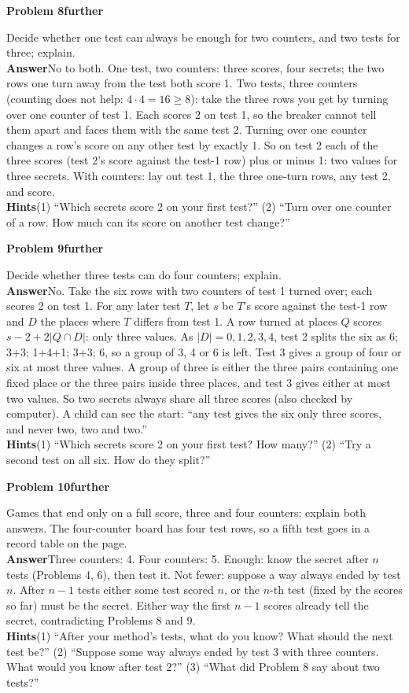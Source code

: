 \documentclass[11pt]{article}
\newcommand{\further}{\textcolor{tagmore}{\textbf{further}}}
\newcommand{\pb}[3]{\par\needspace{5\baselineskip}\medskip\textbf{Problem #1}\enspace{\small page #2}\enspace\textperiodcentered\enspace #3\par\nopagebreak}
\newcommand{\lab}[1]{\textbf{#1}\enspace}
\newcommand{\hints}[1]{\lab{Hints}#1}
\begin{document}
\pb{8}{7}{\further}
Decide whether one test can always be enough for two counters, and two tests for three; explain.\\
\lab{Answer}No to both. One test, two counters: three scores, four secrets; the two rows one turn away from the test both score 1.
Two tests, three counters (counting does not help: $4\cdot4=16\ge 8$): take the three rows you get by turning over one counter of test 1. Each scores 2 on test 1, so the breaker cannot tell them apart and faces them with the same test 2. Turning over one counter changes a row's score on any other test by exactly 1. So on test 2 each of the three scores (test 2's score against the test-1 row) plus or minus 1: two values for three secrets. With counters: lay out test 1, the three one-turn rows, any test 2, and score.\\
\hints{(1) ``Which secrets score 2 on your first test?'' (2) ``Turn over one counter of a row. How much can its score on another test change?''}

\pb{9}{8}{\further}
Decide whether three tests can do four counters; explain.\\
\lab{Answer}No. Take the six rows with two counters of test 1 turned over; each scores 2 on test 1. For any later test $T$, let $s$ be $T$'s score against the test-1 row and $D$ the places where $T$ differs from test 1. A row turned at places $Q$ scores $s-2+2|Q\cap D|$: only three values. As $|D|=0,1,2,3,4$, test 2 splits the six as 6; 3+3; 1+4+1; 3+3; 6, so a group of 3, 4 or 6 is left. Test 3 gives a group of four or six at most three values. A group of three is either the three pairs containing one fixed place or the three pairs inside three places, and test 3 gives either at most two values. So two secrets always share all three scores (also checked by computer). A child can see the start: ``any test gives the six only three scores, and never two, two and two.''\\
\hints{(1) ``Which secrets score 2 on your first test? How many?'' (2) ``Try a second test on all six. How do they split?''}

\pb{10}{9}{\further}
Games that end only on a full score, three and four counters; explain both answers. The four-counter board has four test rows, so a fifth test goes in a record table on the page.\\
\lab{Answer}Three counters: 4. Four counters: 5. Enough: know the secret after $n$ tests (Problems 4, 6), then test it. Not fewer: suppose a way always ended by test $n$. After $n-1$ tests either some test scored $n$, or the $n$-th test (fixed by the scores so far) must be the secret. Either way the first $n-1$ scores already tell the secret, contradicting Problems 8 and 9.\\
\hints{(1) ``After your method's tests, what do you know? What should the next test be?'' (2) ``Suppose some way always ended by test 3 with three counters. What would you know after test 2?'' (3) ``What did Problem 8 say about two tests?''}
\end{document}
